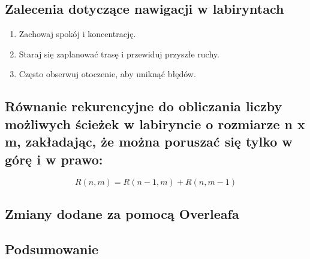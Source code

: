 \subsection{Zalecenia dotyczące nawigacji w labiryntach}
\begin{enumerate}
    \item Zachowaj spokój i koncentrację.
    \item Staraj się zaplanować trasę i przewiduj przyszłe ruchy.
    \item Często obserwuj otoczenie, aby uniknąć błędów.
\end{enumerate}

\subsection{Równanie rekurencyjne do obliczania liczby możliwych ścieżek w labiryncie o rozmiarze n x m, zakładając, że można poruszać się tylko w górę i w prawo:}
\[R(n, m) = R(n-1, m) + R(n, m-1)\]

\subsection{Zmiany dodane za pomocą Overleafa}

\subsection{Podsumowanie}

